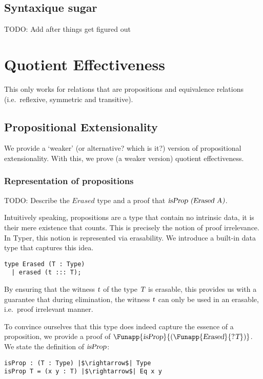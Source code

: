 \documentclass[11pt]{article}
\newcommand\id[1] {\textsl{#1}}
\begin{document}
\subsection{Syntaxique sugar}
TODO: Add after things get figured out

\section{Quotient Effectiveness}
This only works for relations that are propositions and equivalence relations (i.e.\ reflexive, symmetric and transitive).
\subsection{Propositional Extensionality}
We provide a `weaker' (or alternative? which is it?) version of propositional extensionality. With this, we prove (a weaker version) quotient effectiveness.

\subsubsection{Representation of propositions}
TODO: Describe the $Erased$ type and a proof that $\id{isProp (Erased A)}$.

Intuitively speaking, propositions are a type that contain no intrinsic data, it is their mere existence that counts. This is precisely the notion of proof irrelevance. In Typer, this notion is represented via erasability. We introduce a built-in data type that captures this idea.

\begin{verbatim}
type Erased (T : Type)
  | erased (t ::: T);
\end{verbatim}

By ensuring that the witness $\id{t}$ of the type $\id{T}$ is erasable, this provides us with a guarantee that during elimination, the witness $\id{t}$ can only be used in an erasable, i.e.\ proof irrelevant manner.

To convince ourselves that this type does indeed capture the essence of a proposition, we provide a proof of $\Funapp{\id{isProp}}{(\Funapp{\id{Erased}}{?\id{T}})}$. We state the definition of $\id{isProp}$:

\begin{verbatim}
isProp : (T : Type) |$\rightarrow$| Type
isProp T = (x y : T) |$\rightarrow$| Eq x y
\end{verbatim}
\end{document}
